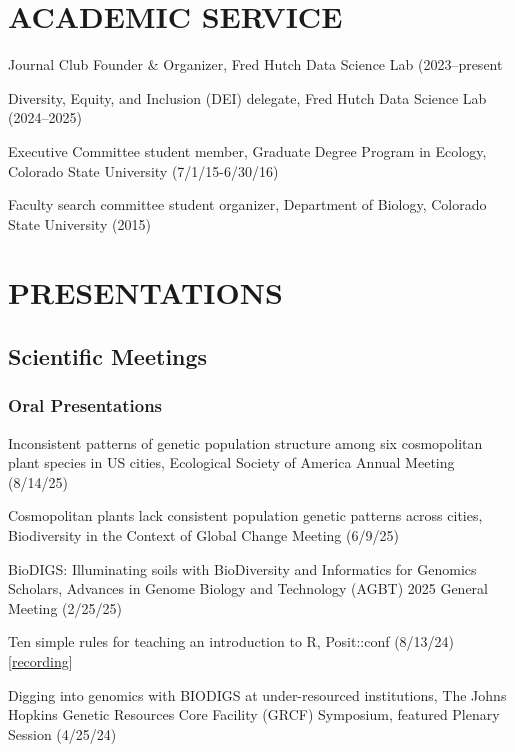 \documentclass{cv}
\begin{document}
\section*{ACADEMIC SERVICE}

Journal Club Founder \& Organizer, Fred Hutch Data Science Lab (2023--present

Diversity, Equity, and Inclusion (DEI) delegate, Fred Hutch Data Science Lab (2024--2025)

Executive Committee student member, Graduate Degree Program in Ecology, Colorado State University (7/1/15-6/30/16)

Faculty search committee student organizer, Department of Biology, Colorado State University (2015)


\section*{PRESENTATIONS}

\subsection*{Scientific Meetings}

\subsubsection*{Oral Presentations}

Inconsistent patterns of genetic population structure among six cosmopolitan plant species in US cities, Ecological Society of America Annual Meeting (8/14/25)

Cosmopolitan plants lack consistent population genetic patterns across cities, Biodiversity in the Context of Global Change Meeting (6/9/25)

BioDIGS: Illuminating soils with BioDiversity and Informatics for Genomics Scholars, Advances in Genome Biology and Technology (AGBT) 2025 General Meeting (2/25/25)

Ten simple rules for teaching an introduction to R, Posit::conf (8/13/24) [\href{https://youtu.be/wIt-ypW-a4M?si=VNdVhDTlGUkqGPHb}{recording}]

Digging into genomics with BIODIGS at under-resourced institutions, The Johns Hopkins Genetic Resources Core Facility (GRCF) Symposium, featured Plenary Session (4/25/24)
\end{document}
